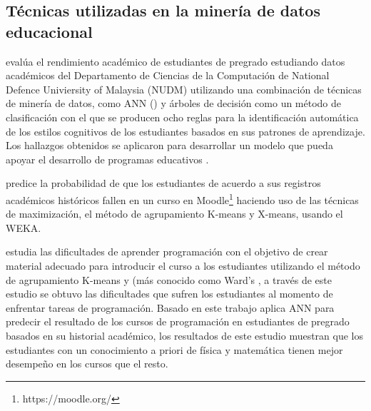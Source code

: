 
\subsection*{Técnicas utilizadas en la minería de datos educacional}


\textcite{chen2008integrated} evalúa el rendimiento académico de estudiantes de pregrado estudiando datos académicos del Departamento de Ciencias de la Computación de National Defence Univiersity of Malaysia (NUDM) utilizando una combinación de técnicas de minería de datos, como ANN () y árboles de decisión como un método de clasificación con el que se producen ocho reglas para la identificación automática de los estilos cognitivos de los estudiantes basados en sus patrones de aprendizaje. Los hallazgos obtenidos se aplicaron para desarrollar un modelo que pueda apoyar el desarrollo de programas educativos .

\textcite{moreno2009data} predice la probabilidad de que los estudiantes de acuerdo a sus registros académicos históricos fallen en un curso  en Moodle\footnote{https://moodle.org/} haciendo uso de las técnicas de maximización, el método de agrupamiento K-means y X-means, usando el  WEKA.


\textcite{lahtinen2005study} estudia las dificultades de aprender programación con el objetivo de crear material adecuado para introducir el curso a los estudiantes utilizando el método de agrupamiento K-means y  (más conocido como Ward's , a través de este estudio se obtuvo las dificultades que sufren los estudiantes al momento de enfrentar tareas de programación. Basado en este trabajo \textcite{akinola2012data} aplica ANN para predecir el resultado de los cursos de programación en estudiantes de pregrado basados en su historial académico, los resultados de este estudio muestran que los estudiantes con un conocimiento a priori de física y matemática tienen mejor desempeño en los cursos que el resto.

